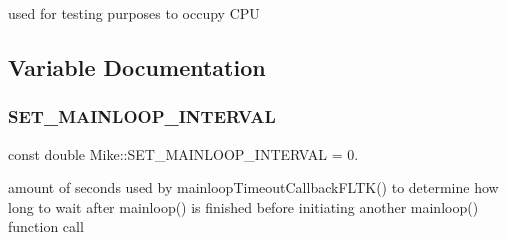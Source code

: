 used for testing purposes to occupy C\+PU 

\subsection{Variable Documentation}
\mbox{\label{namespace_mike_abbeda217f93388b7dd036c32d183f426}} 
\subsubsection{\texorpdfstring{S\+E\+T\+\_\+\+M\+A\+I\+N\+L\+O\+O\+P\+\_\+\+I\+N\+T\+E\+R\+V\+AL}{SET\_MAINLOOP\_INTERVAL}}
{\footnotesize\ttfamily const double Mike\+::\+S\+E\+T\+\_\+\+M\+A\+I\+N\+L\+O\+O\+P\+\_\+\+I\+N\+T\+E\+R\+V\+AL = 0.\hspace{0.3cm}{\ttfamily [static]}}

amount of seconds used by mainloop\+Timeout\+Callback\+F\+L\+T\+K() to determine how long to wait after mainloop() is finished before initiating another mainloop() function call 